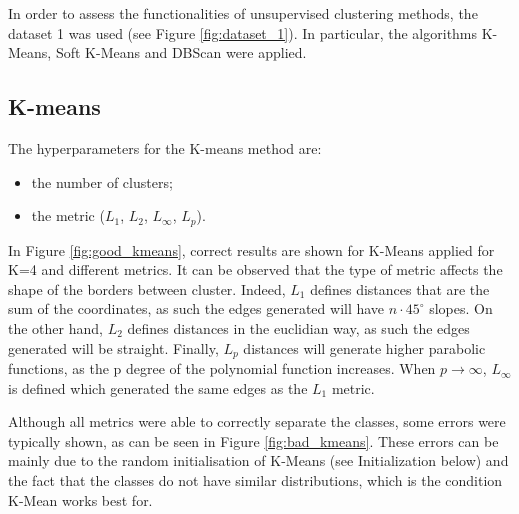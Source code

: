 \documentclass[a4paper,10pt]{article}
\begin{document}

In order to assess the functionalities of unsupervised clustering methods, the dataset 1 was used (see Figure \ref{fig:dataset_1}). In particular, the algorithms K-Means, Soft K-Means and DBScan were applied.

\subsection{K-means}

The hyperparameters for the K-means method are:
\begin{itemize}
\item the number of clusters;
\item the metric ($L_1$, $L_2$, $L_{\infty}$, $L_p$).
\end{itemize}

In Figure \ref{fig:good_kmeans}, correct results are shown for K-Means applied for K=4 and different metrics. It can be observed that the type of metric affects the shape of the borders between cluster. Indeed, $L_1$ defines distances that are the sum of the coordinates, as such the edges generated will have $n\cdot 45^{\circ}$ slopes. On the other hand, $L_2$ defines distances in the euclidian way, as such the edges generated will be straight. Finally, $L_p$ distances will generate higher parabolic functions, as the p degree of the polynomial function increases. When $p\rightarrow\infty$, $L_{\infty}$ is defined which generated the same edges as the $L_1$ metric. 

Although all metrics were able to correctly separate the classes, some errors were typically shown, as can be seen in Figure \ref{fig:bad_kmeans}. These errors can be mainly due to the random initialisation of K-Means (see Initialization below) and the fact that the classes do not have similar distributions, which is the condition K-Mean works best for. 
\end{document}
